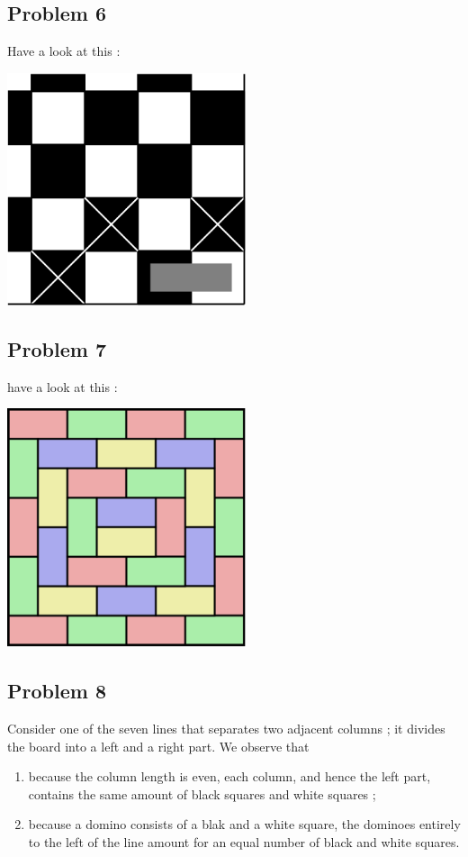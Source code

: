 \documentclass[12pt,a4paper,article,english,firamath]{nsi}
\begin{document}
\subsection*{Problem 6}

Have a look at this :
\begin{center}
  \includegraphics[width=7cm]{img/06}\\[4em]
\end{center}

\subsection*{Problem 7}

have a look at this :
\begin{center}
  \includegraphics[width=7cm]{img/07}
\end{center}

\subsection*{Problem 8}

Consider one of the seven lines that separates two adjacent columns ; it divides the board into a left and a right part. We observe that 
\begin{enumerate}
  \item	because the column length is even, each column, and hence the left part, contains the same amount of black squares and white squares ;
  \item	because a domino consists of a blak and a white square, the dominoes entirely to
  the left of the line amount for an equal number of black and white squares.
\end{enumerate}
\end{document}
